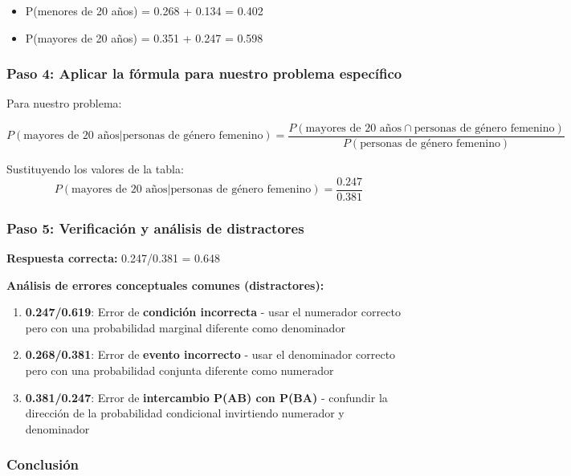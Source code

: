 \documentclass[
]{article}
\providecommand{\tightlist}{%
  \setlength{\itemsep}{0pt}\setlength{\parskip}{0pt}}
\begin{document}
\begin{itemize}
\tightlist
\item
  P(menores de 20 años) = 0.268 + 0.134 = 0.402
\item
  P(mayores de 20 años) = 0.351 + 0.247 = 0.598
\end{itemize}

\subsubsection{Paso 4: Aplicar la fórmula para nuestro problema
específico}\label{paso-4-aplicar-la-fuxf3rmula-para-nuestro-problema-especuxedfico}

Para nuestro problema:

\[P(\text{mayores de 20 años} | \text{personas de género femenino}) = \frac{P(\text{mayores de 20 años} \cap \text{personas de género femenino})}{P(\text{personas de género femenino})}\]

Sustituyendo los valores de la tabla:
\[P(\text{mayores de 20 años} | \text{personas de género femenino}) = \frac{0.247}{0.381}\]

\subsubsection{Paso 5: Verificación y análisis de
distractores}\label{paso-5-verificaciuxf3n-y-anuxe1lisis-de-distractores}

\textbf{Respuesta correcta:} 0.247/0.381 = 0.648

\textbf{Análisis de errores conceptuales comunes (distractores):}

\begin{enumerate}
\def\labelenumi{\arabic{enumi}.}
\tightlist
\item
  \textbf{0.247/0.619}: Error de \textbf{condición incorrecta} - usar el
  numerador correcto pero con una probabilidad marginal diferente como
  denominador
\item
  \textbf{0.268/0.381}: Error de \textbf{evento incorrecto} - usar el
  denominador correcto pero con una probabilidad conjunta diferente como
  numerador
\item
  \textbf{0.381/0.247}: Error de \textbf{intercambio P(A\textbar B) con
  P(B\textbar A)} - confundir la dirección de la probabilidad
  condicional invirtiendo numerador y denominador
\end{enumerate}

\subsubsection{Conclusión}\label{conclusiuxf3n}
\end{document}
